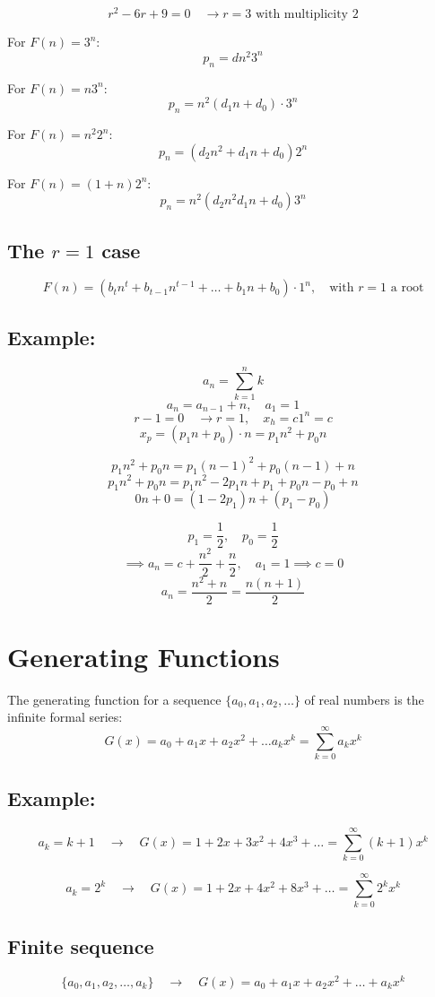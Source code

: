 \documentclass[11pt]{article}
\begin{document}
\[
r^2 - 6r + 9 = 0 \quad \rightarrow r = 3 \text{ with multiplicity } 2
\]

For $F(n) = 3^n$:
\[
p_n = d n^2 3^n
\]

For $F(n) = n 3^n$:
\[
p_n = n^2 (d_1 n + d_0) \cdot 3^n
\]

For $F(n) = n^2 2^n$:
\[
p_n = (d_2 n^2 + d_1 n + d_0) 2^n
\]

For $F(n) = (1 + n) 2^n$:
\[
p_n = n^2 (d_2 n^2 d_1 n + d_0) 3^n
\]

\subsection{The $r = 1$ case}
\[
F(n) = (b_t n^t + b_{t-1} n^{t-1} + \dots + b_1 n + b_0) \cdot 1^n, \quad \text{with } r = 1 \text{ a root}
\]

\subsection*{Example:}
\[
a_n = \sum_{k = 1}^{n} k
\]
\[
a_n = a_{n-1} + n, \quad a_1 = 1
\]
\[
r - 1 = 0 \quad \rightarrow r = 1, \quad x_h = c 1^n = c
\]
\[
x_p = (p_1 n + p_0) \cdot n = p_1 n^2 + p_0 n
\]

\[
p_1 n^2 + p_0 n = p_1 (n-1)^2 + p_0 (n-1) + n
\]
\[
p_1 n^2 + p_0 n = p_1 n^2 - 2 p_1 n + p_1 + p_0 n - p_0 + n
\]
\[
0n + 0 = (1 - 2p_1) n + (p_1 - p_0)
\]

\[
p_1 = \frac{1}{2}, \quad p_0 = \frac{1}{2}
\]
\[
\implies a_n = c + \frac{n^2}{2} + \frac{n}{2}, \quad a_1 = 1 \implies c = 0
\]
\[
a_n = \frac{n^2 + n}{2} = \frac{n(n+1)}{2}
\]

\section{Generating Functions}
The generating function for a sequence $\{a_0, a_1, a_2, \dots\}$ of real numbers is the infinite formal series:
\[
G(x) = a_0 + a_1 x + a_2 x^2 + \dots a_k x^k = \sum_{k=0}^{\infty} a_k x^k
\]

\subsection*{Example:}
\[
a_k = k + 1 \quad \rightarrow \quad G(x) = 1 + 2x + 3x^2 + 4x^3 + \dots = \sum_{k=0}^{\infty} (k+1) x^k
\]

\[
a_k = 2^k \quad \rightarrow \quad G(x) = 1 + 2x + 4x^2 + 8x^3 + \dots = \sum_{k=0}^{\infty} 2^k x^k
\]

\subsection{Finite sequence}
\[
\{a_0, a_1, a_2, \dots, a_k\} \quad \rightarrow \quad G(x) = a_0 + a_1 x + a_2 x^2 + \dots + a_k x^k
\]
\end{document}
